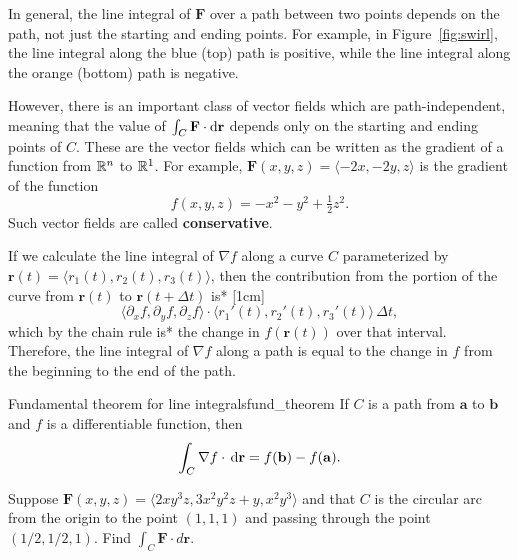 \documentclass[prettycode,shellescape]{watsonbook}
\begin{document}
In general, the line integral of $\mathbf{F}$ over a path between two
points depends on the path, not just the starting and ending points.
For example, in Figure~\ref{fig:swirl}, the line integral along the
blue (top) path is positive, while the line integral along the orange
(bottom) path is negative.

However, there is an important class of vector fields which are
path-independent, meaning that the value of $\int_C \mathbf{F} \cdot
\mathrm{d}\mathbf{r}$ depends only on the starting and ending points of $C$.
These are the vector fields which can be written as the gradient of a
function from $\mathbb{R}^n$ to $\mathbb{R}^1$. For example, $\mathbf{F}(x,y,z) =
\langle -2x, -2y, z \rangle$ is the gradient of the function
\[
  f(x,y,z) = -x^2-y^2 + \tfrac{1}{2}z^2. 
\]
Such vector fields are called \textbf{conservative}. 

If we calculate the line integral of $\nabla f$ along a curve $C$
parameterized by $\mathbf{r}(t) = \langle r_1(t), r_2(t), r_3(t) \rangle$,
then the contribution from the portion of the curve from
$\mathbf{r}(t)$ to $\mathbf{r}(t+\Delta t)$ is*
[1cm]
\[
  \langle \partial_x f, \partial_y f, \partial_z f \rangle \cdot
  \langle r_1'(t), r_2'(t), r_3'(t) \rangle \, \Delta t, 
\]
which by the chain rule is* the change in $f(\mathbf{r}(t))$ over that
interval. Therefore, the line integral of $\nabla f$ along a path is
equal to the change in $f$ from the beginning to the end of the path.

\begin{theo}{Fundamental theorem for line integrals}{fund_theorem}
  If $C$ is a path from $\mathbf{a}$ to $\mathbf{b}$ and $f$ is a
  differentiable function, then 
  \[
    \int_C \nabla f \cdot \, {\mathrm{d}}\mathbf{r} = f(\mathbf{b}) - f(\mathbf{a}). 
  \]
\end{theo}

\begin{example}{}{}
  Suppose $\mathbf{F}(x,y,z) = \langle 2  x y^{3} z, 3  x^{2} y^{2}
  z + y, x^{2} y^{3} \rangle$ and that $C$ is the circular arc from the
  origin to the point $(1,1,1)$ and passing through the point
  $(1/2,1/2,1)$. Find $\int_C \mathbf{F} \cdot d \mathbf{r}$. 
\end{example}
\end{document}
